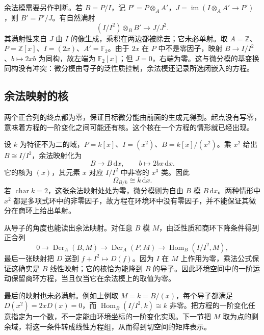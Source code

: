 \ProseParagraphBreak

余法模需要另作判断。若 \(B=P/I\)，记 \(P'=P\otimes_A A'\)，\(J=\operatorname{im}(I\otimes_A A'\to P')\)，则 \(B'=P'/J\)。有自然满射
\[
	(I/I^2)\otimes_B B'\longrightarrow J/J^2.
\]
其满射性来自 \(J\) 由 \(I\) 的像生成，乘积在两边都被除去；它未必单射。取 \(A=\mathbb Z\)、\(P=\mathbb Z[x]\)、\(I=(2x)\)、\(A'=\mathbb F_2\)。由于 \(2x\) 在 \(P\) 中不是零因子，映射 \(B\to I/I^2\)、\(b\mapsto2xb\) 为同构，故左端为 \(\mathbb F_2[x]\)；但 \(J=0\)，右端为零。这与微分模的基变换同构没有冲突：微分模由导子的泛性质控制，余法模还记录所选闭嵌入的方程。

\subsection{余法映射的核}
\label{g5:subsec:0502:04}

两个正合列的终点都为零，保证目标微分能由前面的生成元得到。起点没有写零，意味着方程的一阶变化之间可能还有核。这个核在一个方程的情形就已经出现。

\begin{example}\label{g5:exm:conormal-dual-number-kernel}
	设 \(k\) 为特征不为二的域，\(P=k[x]\)、\(I=(x^2)\)、\(B=k[x]/(x^2)\)。乘 \(x^2\) 给出 \(B\cong I/I^2\)，余法映射化为
	\[
		B\longrightarrow B\,\mathrm{d}x,\qquad
		b\longmapsto2bx\,\mathrm{d}x.
	\]
	它的核为 \((x)\)，其元素 \(x\) 对应 \(I/I^2\) 中非零的 \(x^3\) 类。因此
	\[
		\Omega_{B/k}\cong k\,\mathrm{d}x.
	\]
	若 \(\operatorname{char}k=2\)，这张余法映射处处为零，微分模则为自由 \(B\) 模 \(B\,\mathrm{d}x\)。两种情形中 \(x^2\) 都是多项式环中的非零因子，故方程在环境环中没有零因子，并不能保证其微分在商环上给出单射。
\end{example}

从导子的角度也能读出余法映射。对任意 \(B\) 模 \(M\)，由泛性质和商环下降条件得到正合列
\[
	0\longrightarrow\operatorname{Der}_A(B,M)
	\longrightarrow\operatorname{Der}_A(P,M)
	\longrightarrow\operatorname{Hom}_B(I/I^2,M),
\]
最后一张映射把 \(D\) 送到 \(f+I^2\mapsto D(f)\)。因为 \(I\) 在 \(M\) 上作用为零，乘法公式保证这确实是 \(B\) 线性映射；它的核恰为能降到 \(B\) 的导子。因此环境空间中的一阶运动保留商环方程，当且仅当它在余法模上的取值为零。

\ProseParagraphBreak

最后的映射也未必满射。例如上例取 \(M=k=B/(x)\)，每个导子都满足 \(D(x^2)=2xD(x)=0\)，而
\(\operatorname{Hom}_B(I/I^2,k)\cong k\) 非零。把方程的一阶变化任意指定为一个数，不一定能由环境坐标的一阶变化实现。下一节把 \(M\) 取为点的剩余域，将这一条件转成线性方程组，从而得到切空间的矩阵表示。
